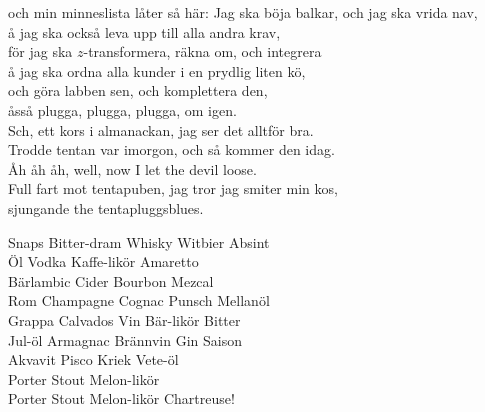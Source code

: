 \documentclass[a6paper, 10pt, twoside]{article}
\begin{document}
\begin{lyrics}
och min minneslista låter så här:
\newpage
\noindent
Jag ska böja balkar, och jag ska vrida nav, \\
å jag ska också leva upp till alla andra krav, \\
för jag ska $z$-transformera, räkna om, och integrera \\
å jag ska ordna alla kunder i en prydlig liten kö, \\
och göra labben sen, och komplettera den, \\
åsså plugga, plugga, plugga, om igen.
\vspace{5pt} \\
Sch, ett kors i almanackan, jag ser det alltför bra. \\
Trodde tentan var imorgon, och så kommer den idag. \\
Åh åh åh, well, now I let the devil loose. \\
Full fart mot tentapuben, jag tror jag smiter min kos, \\
sjungande the tentapluggsblues. 
\end{lyrics}

\vspace{20pt}
\begin{center}
\end{center}
\begin{lyrics}
Snaps Bitter-dram Whisky Witbier Absint \\
Öl Vodka Kaffe-likör Amaretto \\
Bärlambic Cider Bourbon Mezcal \\
Rom Champagne Cognac Punsch Mellanöl
\vspace{5pt} \\
Grappa Calvados   Vin Bär-likör Bitter \\
Jul-öl Armagnac   Brännvin Gin Saison \\
Akvavit Pisco Kriek Vete-öl
\vspace{5pt} \\
Porter Stout Melon-likör   \\
Porter Stout Melon-likör Chartreuse!
\end{lyrics}
\end{document}
